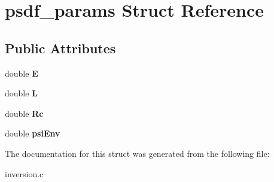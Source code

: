 \hypertarget{structpsdf__params}{}\section{psdf\+\_\+params Struct Reference}
\label{structpsdf__params}
\subsection*{Public Attributes}
\begin{DoxyCompactItemize}
\item 
\mbox{\label{structpsdf__params_a0f541e965d4e16a341fa86a72dc0e204}} 
double {\bfseries E}
\item 
\mbox{\label{structpsdf__params_a65b3a83c98d2af597c0996a1b9247e1b}} 
double {\bfseries L}
\item 
\mbox{\label{structpsdf__params_a3e3c8ef59f558b24a8e8dfc8d01eecdf}} 
double {\bfseries Rc}
\item 
\mbox{\label{structpsdf__params_a6afebc28046a55a826770ed6b292b2d1}} 
double {\bfseries psi\+Env}
\end{DoxyCompactItemize}


The documentation for this struct was generated from the following file\+:\begin{DoxyCompactItemize}
\item 
inversion.\+c\end{DoxyCompactItemize}
